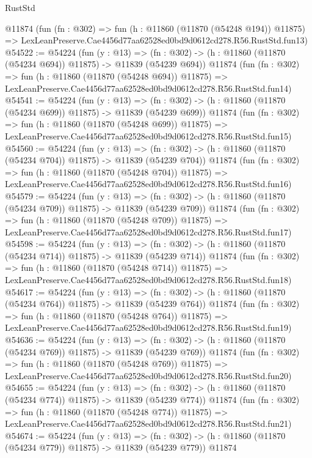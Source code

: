 \begin{lexlean}{RustStd}
\begin{coremodule}
    @11874
    (fun (fn : @302) =>
    fun (h : @11860 (@11870 (@54248 @194)) @11875) =>
    LexLeanPreserve.Cae4456d77aa62528ed0bd9d0612cd278.R56.RustStd.fun13)
@54522 := @54224
    (fun (y : @13) =>
    (fn : @302) -> (h : @11860 (@11870 (@54234 @694)) @11875) -> @11839 (@54239 @694))
    @11874
    (fun (fn : @302) =>
    fun (h : @11860 (@11870 (@54248 @694)) @11875) =>
    LexLeanPreserve.Cae4456d77aa62528ed0bd9d0612cd278.R56.RustStd.fun14)
@54541 := @54224
    (fun (y : @13) =>
    (fn : @302) -> (h : @11860 (@11870 (@54234 @699)) @11875) -> @11839 (@54239 @699))
    @11874
    (fun (fn : @302) =>
    fun (h : @11860 (@11870 (@54248 @699)) @11875) =>
    LexLeanPreserve.Cae4456d77aa62528ed0bd9d0612cd278.R56.RustStd.fun15)
@54560 := @54224
    (fun (y : @13) =>
    (fn : @302) -> (h : @11860 (@11870 (@54234 @704)) @11875) -> @11839 (@54239 @704))
    @11874
    (fun (fn : @302) =>
    fun (h : @11860 (@11870 (@54248 @704)) @11875) =>
    LexLeanPreserve.Cae4456d77aa62528ed0bd9d0612cd278.R56.RustStd.fun16)
@54579 := @54224
    (fun (y : @13) =>
    (fn : @302) -> (h : @11860 (@11870 (@54234 @709)) @11875) -> @11839 (@54239 @709))
    @11874
    (fun (fn : @302) =>
    fun (h : @11860 (@11870 (@54248 @709)) @11875) =>
    LexLeanPreserve.Cae4456d77aa62528ed0bd9d0612cd278.R56.RustStd.fun17)
@54598 := @54224
    (fun (y : @13) =>
    (fn : @302) -> (h : @11860 (@11870 (@54234 @714)) @11875) -> @11839 (@54239 @714))
    @11874
    (fun (fn : @302) =>
    fun (h : @11860 (@11870 (@54248 @714)) @11875) =>
    LexLeanPreserve.Cae4456d77aa62528ed0bd9d0612cd278.R56.RustStd.fun18)
@54617 := @54224
    (fun (y : @13) =>
    (fn : @302) -> (h : @11860 (@11870 (@54234 @764)) @11875) -> @11839 (@54239 @764))
    @11874
    (fun (fn : @302) =>
    fun (h : @11860 (@11870 (@54248 @764)) @11875) =>
    LexLeanPreserve.Cae4456d77aa62528ed0bd9d0612cd278.R56.RustStd.fun19)
@54636 := @54224
    (fun (y : @13) =>
    (fn : @302) -> (h : @11860 (@11870 (@54234 @769)) @11875) -> @11839 (@54239 @769))
    @11874
    (fun (fn : @302) =>
    fun (h : @11860 (@11870 (@54248 @769)) @11875) =>
    LexLeanPreserve.Cae4456d77aa62528ed0bd9d0612cd278.R56.RustStd.fun20)
@54655 := @54224
    (fun (y : @13) =>
    (fn : @302) -> (h : @11860 (@11870 (@54234 @774)) @11875) -> @11839 (@54239 @774))
    @11874
    (fun (fn : @302) =>
    fun (h : @11860 (@11870 (@54248 @774)) @11875) =>
    LexLeanPreserve.Cae4456d77aa62528ed0bd9d0612cd278.R56.RustStd.fun21)
@54674 := @54224
    (fun (y : @13) =>
    (fn : @302) -> (h : @11860 (@11870 (@54234 @779)) @11875) -> @11839 (@54239 @779))
    @11874

\end{coremodule}
\end{lexlean}
